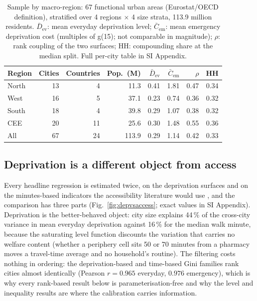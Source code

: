 \documentclass[9pt,twocolumn]{article}
\newcommand{\gref}{g(15)}
\begin{document}
\begin{table}[t]
\centering
\caption{Sample by macro-region: 67 functional urban areas (Eurostat/OECD
definition), stratified over 4 regions $\times$ 4 size strata, 113.9
million residents. $\bar D_{\mathrm{ev}}$: mean everyday deprivation
level; $\bar C_{\mathrm{em}}$: mean emergency deprivation cost (multiples
of \gref{}; not comparable in magnitude); $\rho$: rank coupling of the
two surfaces; HH: compounding share at the median split. Full per-city
table in SI Appendix.}
\label{tab:sample}
\footnotesize
\setlength{\tabcolsep}{3.5pt}
\begin{tabular}{@{}lrrrrrrr@{}}
\toprule
Region & Cities & Countries & Pop.\ (M) & $\bar D_{\mathrm{ev}}$ & $\bar C_{\mathrm{em}}$ & $\rho$ & HH \\
\midrule
North  & 13 & 4  & 11.3 & 0.41 & 1.81 & 0.47 & 0.34 \\
West   & 16 & 5  & 37.1 & 0.23 & 0.74 & 0.36 & 0.32 \\
South  & 18 & 4  & 39.8 & 0.29 & 1.07 & 0.38 & 0.32 \\
CEE    & 20 & 11 & 25.6 & 0.30 & 1.48 & 0.55 & 0.36 \\
\midrule
All    & 67 & 24 & 113.9 & 0.29 & 1.14 & 0.42 & 0.33 \\
\bottomrule
\end{tabular}
\end{table}

\subsection*{Deprivation is a different object from access}

Every headline regression is estimated twice, on the deprivation surfaces
and on the minutes-based indicators the accessibility literature would use
\citep{nicoletti2023disadvantaged,wu2025global}, and the comparison has
three parts (Fig.~\ref{fig:depvsaccess}; exact values in SI Appendix).
Deprivation is the better-behaved object: city size explains 44\,\% of the
cross-city variance in mean everyday deprivation against 16\,\% for the
median walk minute, because the saturating level function discounts the
variation that carries no welfare content (whether a periphery cell sits
50 or 70 minutes from a pharmacy moves a travel-time average and no
household's routine). The filtering costs nothing in ordering: the
deprivation-based and time-based Gini families rank cities almost
identically (Pearson $r = 0.965$ everyday, $0.976$ emergency), which is why
every rank-based result below is parameterisation-free and why the level
and inequality results are where the calibration carries information.
\end{document}
